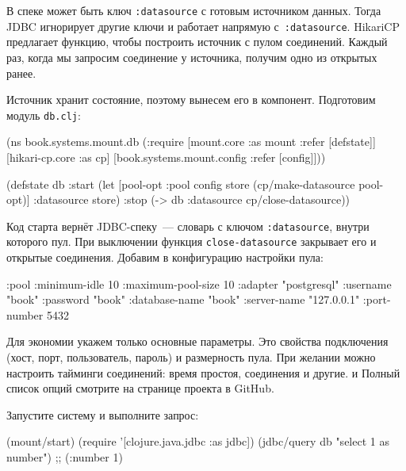 В спеке может быть ключ \verb|:datasource| с готовым источником данных. Тогда
JDBC игнорирует другие ключи и работает напрямую с~\verb|:datasource|. HikariCP
предлагает функцию, чтобы построить источник с пулом соединений. Каждый раз,
когда мы запросим соединение у источника, получим одно из открытых ранее.


Источник хранит состояние, поэтому вынесем его в компонент. Подготовим модуль
\verb|db.clj|:

\begin{english}
  \begin{clojure}
(ns book.systems.mount.db
  (:require
   [mount.core :as mount :refer [defstate]]
   [hikari-cp.core :as cp]
   [book.systems.mount.config :refer [config]]))

(defstate db
  :start
  (let [{pool-opt :pool} config
        store (cp/make-datasource pool-opt)]
    {:datasource store})
  :stop
  (-> db :datasource cp/close-datasource))
  \end{clojure}
\end{english}


Код старта вернёт JDBC-спеку~--- словарь с ключом \verb|:datasource|, внутри
которого пул. При выключении функция \verb|close-datasource| закрывает его и
открытые соединения. Добавим в конфигурацию настройки пула:

\begin{english}
  \begin{clojure}
{:pool {:minimum-idle       10
        :maximum-pool-size  10
        :adapter            "postgresql"
        :username           "book"
        :password           "book"
        :database-name      "book"
        :server-name        "127.0.0.1"
        :port-number        5432}}
  \end{clojure}
\end{english}

Для экономии укажем только основные параметры. Это свойства подключения (хост,
порт, пользователь, пароль) и размерность пула. При желании можно настроить
тайминги соединений: время простоя, соединения и другие. и Полный список опций
смотрите на странице проекта в GitHub.

Запустите систему и выполните запрос:

\begin{english}
  \begin{clojure}
(mount/start)
(require '[clojure.java.jdbc :as jdbc])
(jdbc/query db "select 1 as number")
;; ({:number 1})
  \end{clojure}
\end{english}

